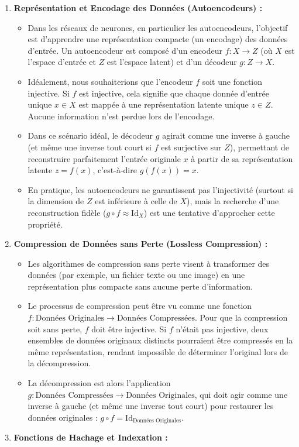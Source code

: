 \documentclass[12pt,a4paper]{report}
\providecommand{\tightlist}{%
  \setlength{\itemsep}{0pt}\setlength{\parskip}{0pt}}
\begin{document}
\begin{enumerate}
\def\labelenumi{\arabic{enumi}.}
\tightlist
\item
  \textbf{Représentation et Encodage des Données (Autoencodeurs) :}

  \begin{itemize}
  \tightlist
  \item
    Dans les réseaux de neurones, en particulier les autoencodeurs,
    l'objectif est d'apprendre une représentation compacte (un encodage)
    des données d'entrée. Un autoencodeur est composé d'un encodeur
    \(f: X \to Z\) (où \(X\) est l'espace d'entrée et \(Z\) est l'espace
    latent) et d'un décodeur \(g: Z \to X\).
  \item
    Idéalement, nous souhaiterions que l'encodeur \(f\) soit une
    fonction injective. Si \(f\) est injective, cela signifie que chaque
    donnée d'entrée unique \(x \in X\) est mappée à une représentation
    latente unique \(z \in Z\). Aucune information n'est perdue lors de
    l'encodage.
  \item
    Dans ce scénario idéal, le décodeur \(g\) agirait comme une inverse
    à gauche (et même une inverse tout court si \(f\) est surjective sur
    \(Z\)), permettant de reconstruire parfaitement l'entrée originale
    \(x\) à partir de sa représentation latente \(z = f(x)\),
    c'est-à-dire \(g(f(x)) = x\).
  \item
    En pratique, les autoencodeurs ne garantissent pas l'injectivité
    (surtout si la dimension de \(Z\) est inférieure à celle de \(X\)),
    mais la recherche d'une reconstruction fidèle
    (\(g \circ f \approx \text{Id}_X\)) est une tentative d'approcher
    cette propriété.
  \end{itemize}
\item
  \textbf{Compression de Données sans Perte (Lossless Compression) :}

  \begin{itemize}
  \tightlist
  \item
    Les algorithmes de compression sans perte visent à transformer des
    données (par exemple, un fichier texte ou une image) en une
    représentation plus compacte sans aucune perte d'information.
  \item
    Le processus de compression peut être vu comme une fonction
    \(f: \text{Données Originales} \to \text{Données Compressées}\).
    Pour que la compression soit sans perte, \(f\) doit être injective.
    Si \(f\) n'était pas injective, deux ensembles de données originaux
    distincts pourraient être compressés en la même représentation,
    rendant impossible de déterminer l'original lors de la
    décompression.
  \item
    La décompression est alors l'application
    \(g: \text{Données Compressées} \to \text{Données Originales}\), qui
    doit agir comme une inverse à gauche (et même une inverse tout
    court) pour restaurer les données originales :
    \(g \circ f = \text{Id}_{\text{Données Originales}}\).
  \end{itemize}
\item
  \textbf{Fonctions de Hachage et Indexation :}


\end{enumerate}
\end{document}
